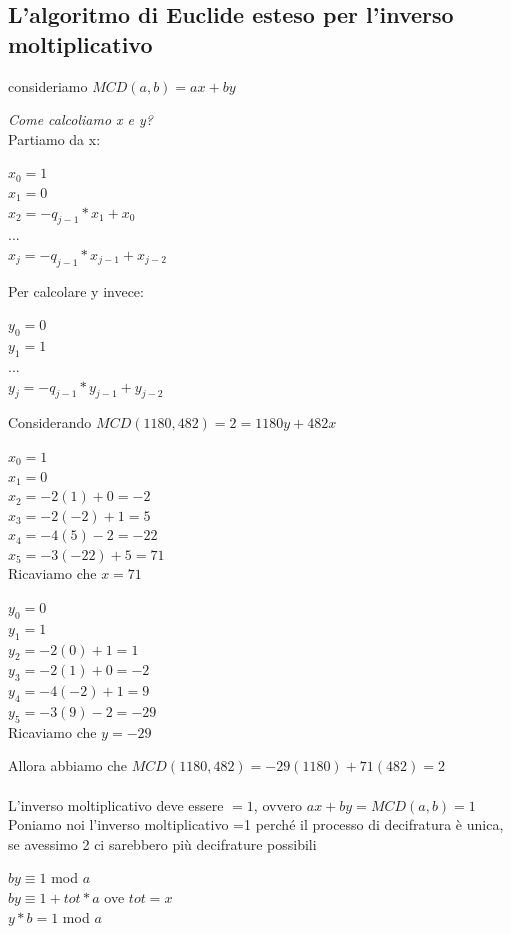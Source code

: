 \documentclass[11pt, oneside]{article}   	%
\begin{document}
\subsection*{L'algoritmo di Euclide esteso per l'inverso moltiplicativo}
\begin{center}
consideriamo $MCD(a,b) = ax+by$\\
\end{center}
\emph{Come calcoliamo x e y?}\\
Partiamo da x:\begin{center}
$x_0 = 1$\\
$x_1 = 0$\\
$x_2 = -q_{j-1} * x_1+x_0$\\
...\\
$x_j = -q_{j-1} * x_{j-1} + x_{j-2}$
\end{center}
Per calcolare y invece: \begin{center}
$y_0 = 0$\\
$y_1 = 1$\\
...\\
$y_j = -q_{j-1}*y_{j-1}+y_{j-2}$
\end{center}
Considerando $MCD(1180,482) = 2 = 1180y+482x$
\begin{center}
$x_0 = 1$\\
$x_1 = 0$\\
$x_2 = -2(1)+0 = -2$\\
$x_3 = -2(-2)+1= 5$\\
$x_4 = -4(5)-2 = -22$\\
$x_5 = -3(-22)+5 = 71$\\
Ricaviamo che $x = 71$\\
\end{center}
\begin{center}
$y_0 = 0$\\
$y_1 = 1$\\
$y_2 = -2(0)+1 = 1$\\
$y_3 = -2(1)+0= -2$\\
$y_4 = -4(-2)+1 = 9$\\
$y_5 = -3(9)-2 = -29$\\
Ricaviamo che $y=-29$
\end{center}
Allora abbiamo che $MCD(1180,482) = -29(1180) + 71(482) = 2$\\\\
L'inverso moltiplicativo deve essere $= 1$, ovvero $ax+by =MCD(a,b)=1$
Poniamo noi l'inverso moltiplicativo =1 perché il processo di decifratura è unica, se avessimo 2 ci sarebbero più decifrature possibili
\begin{center}
$by \equiv 1$ mod $a$\\
$by \equiv 1 + tot * a$ ove $tot = x$\\
$y*b = 1$ mod $a$
\end{center}
\end{document}
